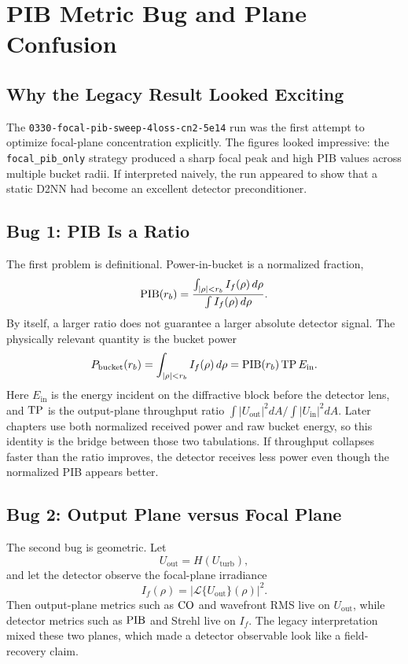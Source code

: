 \chapter{PIB Metric Bug and Plane Confusion}

\section{Why the Legacy Result Looked Exciting}

The \texttt{0330-focal-pib-sweep-4loss-cn2-5e14} run was the first attempt to optimize
focal-plane concentration explicitly. The figures looked impressive: the
\texttt{focal\_pib\_only} strategy produced a sharp focal peak and high PIB values across
multiple bucket radii. If interpreted naively, the run appeared to show that a
static D2NN had become an excellent detector preconditioner.

\section{Bug 1: PIB Is a Ratio}

The first problem is definitional. Power-in-bucket is a normalized fraction,
\begin{equation}
\mathrm{PIB}(r_b)=
\frac{\int_{|\rho|<r_b} I_f(\rho)\, d\rho}{\int I_f(\rho)\, d\rho}.
\end{equation}
By itself, a larger ratio does not guarantee a larger absolute detector signal.
The physically relevant quantity is the bucket power
\begin{equation}
P_{\mathrm{bucket}}(r_b)=\int_{|\rho|<r_b} I_f(\rho)\, d\rho
= \mathrm{PIB}(r_b)\,\mathrm{TP}\,E_{\mathrm{in}}.
\end{equation}
Here $E_{\mathrm{in}}$ is the energy incident on the diffractive block before
the detector lens, and $\mathrm{TP}$ is the output-plane throughput ratio
$\int |U_{\mathrm{out}}|^2 dA / \int |U_{\mathrm{in}}|^2 dA$. Later chapters use
both normalized received power and raw bucket energy, so this identity is the
bridge between those two tabulations.
If throughput collapses faster than the ratio improves, the detector receives
less power even though the normalized PIB appears better.

\section{Bug 2: Output Plane versus Focal Plane}

The second bug is geometric. Let
\begin{equation}
U_{\mathrm{out}} = H(U_{\mathrm{turb}}),
\end{equation}
and let the detector observe the focal-plane irradiance
\begin{equation}
I_f(\rho)=\left| \mathcal{L}\{U_{\mathrm{out}}\}(\rho)\right|^2.
\end{equation}
Then output-plane metrics such as $\mathrm{CO}$ and wavefront RMS live on
$U_{\mathrm{out}}$, while detector metrics such as $\mathrm{PIB}$ and Strehl live on
$I_f$. The legacy interpretation mixed these two planes, which made a detector
observable look like a field-recovery claim.

